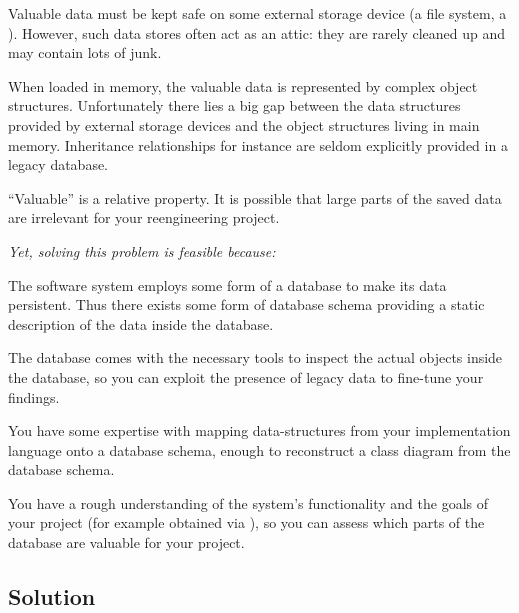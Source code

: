 \documentclass[a4paper,10pt,twoside]{book}
\begin{document}
\begin{bulletlist}
\item Valuable data must be kept safe on some external storage device (\ie a file system, a 
). However, such data stores often act as an attic: they are rarely cleaned 
up and may contain lots of junk.

\item When loaded in memory, the valuable data is represented by complex object structures. 
Unfortunately there lies a big gap between the data structures provided by external storage 
devices and the object structures living in main memory. Inheritance relationships for 
instance are seldom explicitly provided in a legacy database.

\item ``Valuable'' is a relative property. It is possible that large parts of the saved 
data are irrelevant for your reengineering project.
\end{bulletlist}

\emph{Yet, solving this problem is feasible because:}

\begin{bulletlist}
\item The software system employs some form of a database to make its data persistent. Thus 
there exists some form of database schema providing a static description of the data inside 
the database.

\item The database comes with the necessary tools to inspect the actual objects inside the 
database, so you can exploit the presence of legacy data to fine-tune your findings.

\item You have some expertise with mapping data-structures from your implementation 
language onto a database schema, enough to reconstruct a class diagram from the database 
schema.

\item You have a rough understanding of the system's functionality and the goals of your 
project (for example obtained via ), so you can assess 
which parts of the database are valuable for your project.
\end{bulletlist}

\subsection*{Solution}
\end{document}

